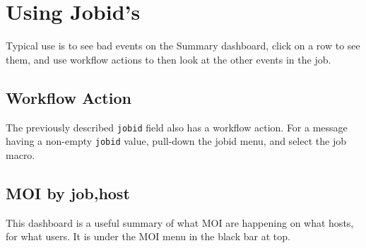 \section{Using Jobid's}
Typical use is to see bad events on the Summary dashboard, click on a row to see them,
and use workflow actions to then look at the other events in the job.
\subsection{Workflow Action}
The previously described {\tt jobid} field also has a workflow action.
For a message having a non-empty {\tt jobid} value, pull-down the jobid menu, 
and select the job macro.
\subsection{MOI by job,host}
This dashboard is a useful summary of what MOI are happening on what hosts,
for what users.  It is under the MOI menu in the black bar at top.
